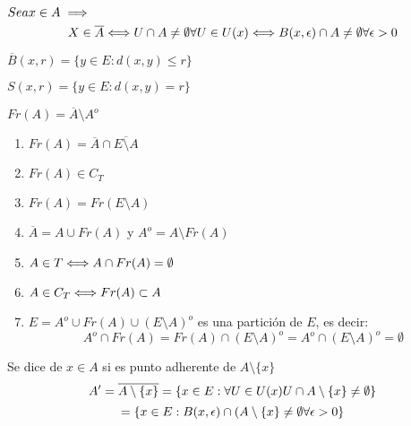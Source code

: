     \begin{definicion}
        $Sea \\ x \in A \implies$
        $$X\in \overline{A} \\ \Longleftrightarrow\\ U \cap A \neq \emptyset \\ \forall U \in U(x) \\ \Longleftrightarrow\\ B(x,\epsilon ) \cap A \neq \emptyset \\ \forall \epsilon >0$$
    \end{definicion}

    \begin{definicion}
        $\overline{B}(x, r) = \{ y \in E : d(x,y) \leq r\}$
    \end{definicion}

    \begin{definicion}[Esfera]
        $S(x,r) = \{ y \in E: d(x,y) = r\}$
    \end{definicion}

    \begin{definicion}[Frontera]
        $Fr(A) = \overline{A} \setminus A^o$
    \end{definicion} 
    
    \begin{enumerate}
        \item $Fr(A) = \overline{A} \cap \overline{E\setminus A}$
        \item $Fr(A) \in C_T$
        \item $Fr(A) = Fr(E\setminus A)$
        \item $\overline{A} = A\cup Fr(A)$ y $A^o = A \setminus Fr(A)$
        \item $A \in T \\ \Longleftrightarrow \\ A \cap Fr(A) = \emptyset$
        \item $A \in C_T \\ \Longleftrightarrow \\ Fr(A) \subset A$
        \item $E = A^o \cup Fr(A) \cup (E\setminus A)^o$ es una partición de $E$, es decir:
        $$A^o \cap Fr(A) =  Fr(A) \cap (E\setminus A)^o = A^o \cap (E\setminus A)^o = \emptyset$$
    \end{enumerate}

    \begin{definicion}
        Se dice de $x\in A$ si es punto adherente de $A\setminus \{x\}$
        $$A' = \overline{A\setminus \{x\}} = \{x \in E : \forall U \in U(x) \\ U \cap A\setminus \{x\} \neq \emptyset \} $$
        $$= \{x \in E : B(x, \epsilon) \cap (A\setminus \{x\} \neq \emptyset \\ \forall \epsilon >0\}$$
    \end{definicion}    

